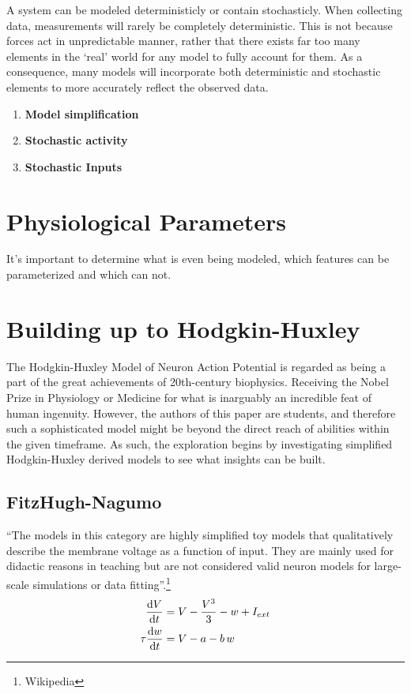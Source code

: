 \documentclass[../../Orator.tex]{subfiles}
\begin{document}
A system can be modeled deterministicly or contain stochasticly. When collecting data, measurements will rarely be completely deterministic. This is not because forces act in unpredictable manner, rather that there exists far too many elements in the `real' world for any model to fully account for them. 
As a consequence, many models will incorporate both deterministic and stochastic elements to more accurately reflect the observed data.
\begin{enumerate}
    \item \textbf{Model simplification}
    \item \textbf{Stochastic activity}
    \item \textbf{Stochastic Inputs}
\end{enumerate}



\newpage
\section{Physiological Parameters}
It's important to determine what is even being modeled, which features can be parameterized and which can not.


\newpage
\section{Building up to Hodgkin-Huxley}

The Hodgkin-Huxley Model of Neuron Action Potential is regarded as being a part of the great achievements of 20th-century biophysics. Receiving the Nobel Prize in Physiology or Medicine for what is inarguably an incredible feat of human ingenuity. However, the authors of this paper are students, and therefore such a sophisticated model might be beyond the direct reach of abilities within the given timeframe. 
As such, the exploration begins by investigating simplified Hodgkin-Huxley derived models to see what insights can be built.

\subsection{FitzHugh-Nagumo}
``The models in this category are highly simplified toy models that qualitatively describe the membrane voltage as a function of input. They are mainly used for didactic reasons in teaching but are not considered valid neuron models for large-scale simulations or data fitting''.\footnote{Wikipedia} 
\begin{subequations}\label{eq:FitNagSys}
    \begin{align}
        \frac{\mathrm{d}\displaystyle V}{\mathrm{d}\displaystyle t} &= V - \frac{V^3}{3} - w + I_{ext} \\ 
        \tau\frac{\mathrm{d}\displaystyle w}{\mathrm{d}\displaystyle t} &= V - a - b\,w 
    \end{align}
\end{subequations}
\end{document}

